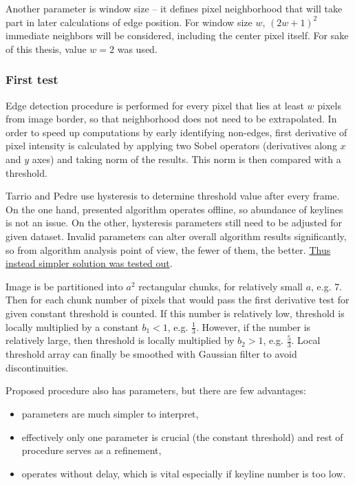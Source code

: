 Another parameter is window size -- it defines pixel neighborhood that will take part in later calculations of edge position. For window size $w$, $(2w+1)^2$ immediate neighbors will be considered, including the center pixel itself. For sake of this thesis, value $w = 2$ was used.

\subsubsection{First test}
\label{edge_first}

Edge detection procedure is performed for every pixel that lies at least $w$ pixels from image border, so that neighborhood does not need to be extrapolated. In order to speed up computations by early identifying non-edges, first derivative of pixel intensity is calculated by applying two Sobel operators (derivatives along $x$ and $y$ axes) and taking norm of the results. This norm is then compared with a threshold. 

Tarrio and Pedre use hysteresis to determine threshold value after every frame. On the one hand, presented algorithm operates offline, so abundance of keylines is not an issue. On the other, hysteresis parameters still need to be adjusted for given dataset. Invalid parameters can alter overall algorithm results significantly, so from algorithm analysis point of view, the fewer of them, the better. \underline{Thus instead simpler solution was tested out}.

Image is be partitioned into $a^2$ rectangular chunks, for relatively small $a$, e.g. 7. Then for each chunk number of pixels that would pass the first derivative test for given constant threshold is counted. If this number is relatively low, threshold is locally multiplied by a constant $b_{1} < 1$, e.g. $\frac{1}{3}$. However, if the number is relatively large, then threshold is locally multiplied by $b_{2} > 1$, e.g. $\frac{5}{3}$. Local threshold array can finally be smoothed with Gaussian filter to avoid discontinuities.

Proposed procedure also has parameters, but there are few advantages:
\begin{itemize}
	\item parameters are much simpler to interpret,
	\item effectively only one parameter is crucial (the constant threshold) and rest of procedure serves as a refinement,
	\item operates without delay, which is vital especially if keyline number is too low.
\end{itemize}

